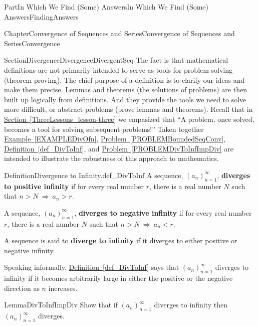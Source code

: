 \documentclass[oneside,10pt,]{book}
\newcommand{\xreffont}{\relax}
\newcommand{\terminology}[1]{\textbf{#1}}
\numberwithin{equation}{part}
\newcommand{\imp}{\ \Rightarrow\ }
\newcommand{\lt}{<}
\begin{document}
\begin{partptx}{Part}{In Which We Find (Some) Answers}{}{In Which We Find (Some) Answers}{}{}{FindingAnswers}
\begin{chapterptx}{Chapter}{Convergence of Sequences and Series}{}{Convergence of Sequences and Series}{}{}{Convergence}
\begin{sectionptx}{Section}{Divergence}{}{Divergence}{}{}{DivergentSeq}
The fact is that mathematical definitions are not primarily intended to serve as tools for problem solving (theorem proving). The chief purpose of a definition is to clarify our ideas and make them precise. Lemmas and theorems (the solutions of problems) are then built up logically from definitions. And they provide the tools we need to solve more difficult, or abstract problems (prove lemmas and theorems). Recall that in \hyperref[ThreeLessons_lesson-three]{Section~{\xreffont\ref{ThreeLessons_lesson-three}}} we empasized that ``A problem, once solved, becomes a tool for solving subsequent problems!'' Taken together \hyperref[EXAMPLEDivOfn]{Example~{\xreffont\ref{EXAMPLEDivOfn}}}, \hyperref[PROBLEMBoundedSeqConv]{Problem~{\xreffont\ref{PROBLEMBoundedSeqConv}}}, \hyperref[def_DivToInf]{Definition~{\xreffont\ref{def_DivToInf}}}, and \hyperref[PROBLEMDivToInfImpDiv]{Problem~{\xreffont\ref{PROBLEMDivToInfImpDiv}}} are intended to illustrate the robustness of this approach to mathematics.%
\begin{definition}{Definition}{Divergence to Infinity.}{def_DivToInf}%
%
%
%
%
%
%
A sequence, \(\left(a_n\right)_{n=1}^\infty\), \terminology{diverges to positive infinity} if for every real number \(r\), there is a real number \(N\) such that \(n>N\imp a_n>r\).%
\par
A sequence, \(\left(a_n\right)_{n=1}^\infty\), \terminology{diverges to negative infinity} if for every real number \(r\), there is a real number \(N\) such that \(n>N\imp a_n\lt r\).%
\par
A sequence is said to \terminology{diverge to infinity} if it diverges to either positive or negative infinity.%
\end{definition}
Speaking informally, \hyperref[def_DivToInf]{Definition~{\xreffont\ref{def_DivToInf}}} says that \(\left(a_n\right)_{n=1}^\infty{}\) diverges to infinity if it becomes arbitrarily large in either the positive or the negative direction as \(n\) increases.%
\begin{lemma}{Lemma}{}{}{DivToInfImpDiv}%
%
%
Show that if \(\left(a_n\right)_{n=1}^\infty\) diverges to infinity then \(\left(a_n\right)_{n=1}^\infty\) diverges.%

\end{lemma}
\end{sectionptx}
\end{chapterptx}
\end{partptx}
\end{document}
